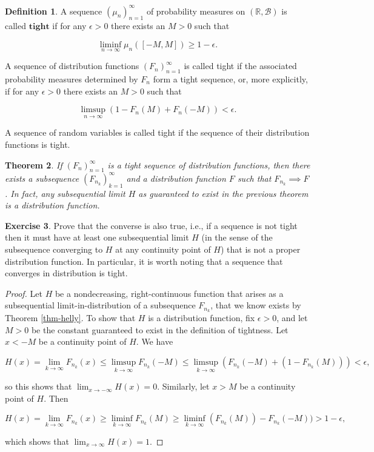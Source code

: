 \documentclass[11pt]{report}
\providecommand{\cal}{\mathcal}
\newcommand{\R}{\mathbb{R}}
\theoremstyle{plain}
\newtheorem{thm}{Theorem}[chapter]
\theoremstyle{definition}
\newtheorem{defn}[thm]{Definition}
\newtheorem{xexercise}[thm]{Exercise}
\begin{document}
\begin{defn}
A sequence $(\mu_n)_{n=1}^\infty$ of probability
measures on $(\R,{\cal B})$ is called $\textbf{tight}$
if for any $\epsilon>0$ there exists an $M>0$ such
that

\[
\liminf_{n\to\infty} \mu_n([-M,M]) \ge 1-\epsilon.
\]

A sequence of distribution functions
$(F_n)_{n=1}^\infty$ is called tight if the
associated probability measures determined by $F_n$
form a tight sequence, or, more explicitly, if for any
$\epsilon>0$ there exists an $M>0$ such that

\[
\limsup_{n\to\infty} (1-F_n(M)+F_n(-M)) < \epsilon.
\]

A sequence of random variables is called tight if
the sequence of their distribution functions is tight.
\end{defn}

\begin{thm}
If $(F_n)_{n=1}^\infty$ is a tight sequence of
distribution functions, then there exists a
subsequence $(F_{n_k})_{k=1}^\infty$ and a
distribution function $F$ such that
$F_{n_k} \implies F$. In fact, any subsequential
limit $H$ as guaranteed to exist in the previous
theorem is a distribution function.
\end{thm}

\begin{xexercise}
Prove that the converse is also true, i.e., if a
sequence is not tight then it must have at least one
subsequential limit $H$ (in the sense of the
subsequence converging to $H$ at any continuity point
of $H$) that is not a proper distribution function.
In particular, it is worth noting that a sequence that
converges in distribution is tight.
\end{xexercise}

\begin{proof}
Let $H$ be a nondecreasing, right-continuous function
that arises as a subsequential limit-in-distribution
of a subsequence $F_{n_k}$, that we know exists by
Theorem \ref{thm-helly}. To show that $H$ is a
distribution function, fix $\epsilon>0$, and let $M>0$
be the constant guaranteed to exist in the definition
of tightness. Let $x<-M$ be a continuity point of $H$.
We have

\[
H(x)=\lim_{k\to\infty} F_{n_k}(x) \le \limsup_{k\to\infty} F_{n_k}(-M) \le \limsup_{k\to\infty} (F_{n_k}(-M)+(1-F_{n_k}(M)) ) < \epsilon,
\]

so this shows that $\lim_{x\to-\infty} H(x) = 0.$
Similarly, let $x>M$ be a continuity point of $H$.
Then

\[
H(x)=\lim_{k\to\infty} F_{n_k}(x) \ge \liminf_{k\to\infty} F_{n_k}(M) \ge \liminf_{k\to\infty} (F_{n_k}(M))-F_{n_k}(-M) ) > 1-\epsilon,
\]

which shows that $\lim_{x\to\infty} H(x)=1.$
\end{proof}
\end{document}
